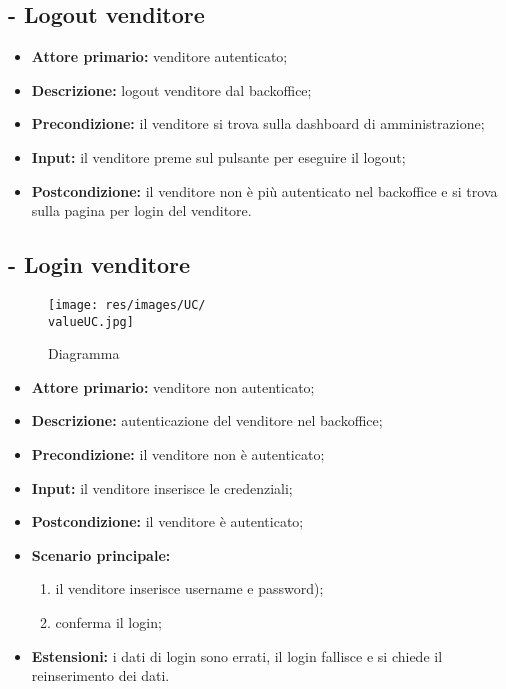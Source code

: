 \stepUserCase
\subsection{ - Logout venditore}
\begin{itemize}
    \item \textbf{Attore primario:} venditore autenticato;
    \item \textbf{Descrizione:} logout venditore dal backoffice;
    \item \textbf{Precondizione:} il venditore si trova sulla dashboard di amministrazione;
    \item \textbf{Input:} il venditore preme sul pulsante per eseguire il logout;
    \item \textbf{Postcondizione:} il venditore non è più autenticato nel backoffice e si trova sulla pagina per login del venditore.
\end{itemize}

\stepUserCase
\subsection{ - Login venditore}
\begin{figure}[H]
    \centering
    \texttt{[image: res/images/UC/\\valueUC.jpg]}
    \caption{Diagramma }
\end{figure}
\begin{itemize}
    \item \textbf{Attore primario:} venditore non autenticato;
    \item \textbf{Descrizione:} autenticazione del venditore nel backoffice;
    \item \textbf{Precondizione:} il venditore non è autenticato;
    \item \textbf{Input:} il venditore inserisce le credenziali;
    \item \textbf{Postcondizione:} il venditore è autenticato;
    \item \textbf{Scenario principale:}
          \begin{enumerate}
              \item il venditore inserisce username e password);
              \item conferma il login;
          \end{enumerate}
    \item \textbf{Estensioni:} i dati di login sono errati, il login fallisce e si chiede il reinserimento dei dati.
\end{itemize}

